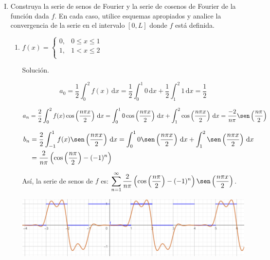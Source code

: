 \documentclass[fleqn]{article}
\newcommand{\intg}[3]{\int_{#1}^{#2} #3 \, \mathrm{d}x}
\begin{document}
\begin{enumerate}[I.]
\begin{enumerate}[(1)]
			\bfseries
		\end{enumerate}

		\item Construya la serie de senos de Fourier y la serie de cosenos de Fourier de la función dada $f$. En cada caso, utilice esquemas apropiados y analice la convergencia de la serie en el intervalo $ [0,L] $ donde $f$ está definida.
		
		\begin{enumerate}[(1)]
			\item $ f(x) = \begin{cases}
				0, & 0 \leq x \leq 1 \\
				1, & 1 < x \leq 2 \\
			\end{cases} $

			Solución.

			\normalfont

			\begin{equation*}
				a_0 = \dfrac{1}{2} \intg{0}{2}{f(x)} = \dfrac{1}{2} \intg{0}{1}{0} + \dfrac{1}{2} \intg{1}{2}{1} = \dfrac{1}{2}
			\end{equation*}

			\begin{equation*}
				a_n = \dfrac{2}{2} \intg{0}{2}{f(x) \cos \left( \dfrac{n \pi x}{2} \right)} = \intg{0}{1}{0 \cos \left( \dfrac{n \pi x}{2} \right)} + \intg{1}{2}{\cos \left( \dfrac{n \pi x}{2} \right)} = \dfrac{-2}{n \pi} \sen \left( \dfrac{n \pi}{2} \right)
			\end{equation*}

			\begin{align*}
				b_n &= \dfrac{2}{2} \intg{-1}{1}{f(x) \sen \left( \dfrac{n \pi x}{2} \right)} = \intg{0}{1}{0 \sen \left( \dfrac{n \pi x}{2} \right)} + \intg{1}{2}{\sen \left( \dfrac{n \pi x}{2} \right)} \\
				&= \dfrac{2}{n \pi} \left( \cos \left( \dfrac{n \pi}{2} \right) - (-1)^n \right)
			\end{align*}

			Así, la serie de senos de $ f $ es: $ \displaystyle \sum_{n=1}^{\infty} \dfrac{2}{n \pi} \left( \cos \left( \dfrac{n \pi}{2} \right) - (-1)^n \right) \sen \left( \dfrac{n \pi x}{2} \right) $.

			\includegraphics[width=\linewidth]{Ejer6s.png}


\end{enumerate}
\end{enumerate}
\end{document}
